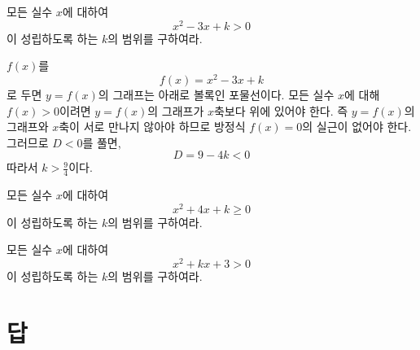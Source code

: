 \documentclass{oblivoir}
\begin{document}
%
\exam{}
모든 실수 \(x\)에 대하여
\[x^2-3x+k>0\]
이 성립하도록 하는 \(k\)의 범위를 구하여라.
\begin{mdframed}[frametitle=풀이]
\(f(x)\)를
\[f(x)=x^2-3x+k\]
로 두면 \(y=f(x)\)의 그래프는 아래로 볼록인 포물선이다.
모든 실수 \(x\)에 대해 \(f(x)>0\)이려면 \(y=f(x)\)의 그래프가 \(x\)축보다 위에 있어야 한다.
즉 \(y=f(x)\)의 그래프와 \(x\)축이 서로 만나지 않아야 하므로 방정식 \(f(x)=0\)의 실근이 없어야 한다.
그러므로 \(D<0\)를 풀면,
\[D=9-4k<0\]
따라서
\(k>\frac94\)이다.
\end{mdframed}

%
\prob{}\label{ineq3}
모든 실수 \(x\)에 대하여
\[x^2+4x+k\ge0\]
이 성립하도록 하는 \(k\)의 범위를 구하여라.

%
\prob{}\label{ineq4}
모든 실수 \(x\)에 대하여
\[x^2+kx+3>0\]
이 성립하도록 하는 \(k\)의 범위를 구하여라.



\section*{답}
\end{document}
